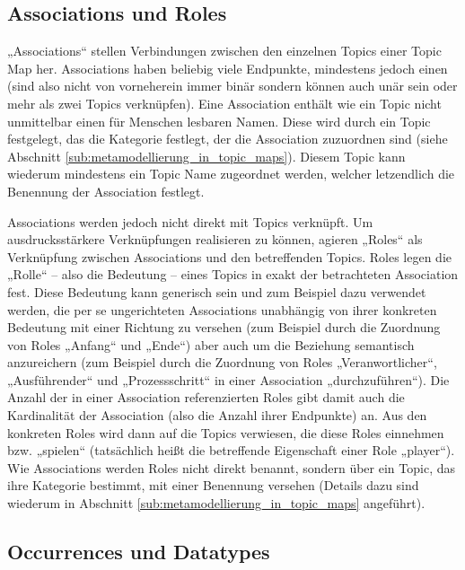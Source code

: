 
\subsection{Associations und Roles} %
\label{sub:associations_und_roles}

„Associations“ stellen Verbindungen zwischen den einzelnen Topics einer Topic Map her. Associations haben beliebig viele Endpunkte, mindestens jedoch einen (sind also nicht von vorneherein immer binär sondern können auch unär sein oder mehr als zwei Topics verknüpfen). Eine Association enthält wie ein Topic nicht unmittelbar einen für Menschen lesbaren Namen. Diese wird durch ein Topic festgelegt, das die Kategorie festlegt, der die Association zuzuordnen sind (siehe Abschnitt \ref{sub:metamodellierung_in_topic_maps}). Diesem Topic kann wiederum mindestens ein Topic Name zugeordnet werden, welcher letzendlich die Benennung der Association festlegt.

Associations werden jedoch nicht direkt mit Topics verknüpft. Um ausdrucksstärkere Verknüpfungen realisieren zu können, agieren „Roles“ als Verknüpfung zwischen Associations und den betreffenden Topics. Roles legen die „Rolle“ -- also die Bedeutung -- eines Topics in exakt der betrachteten Association fest. Diese Bedeutung kann generisch sein und zum Beispiel dazu verwendet werden, die per se ungerichteten Associations unabhängig von ihrer konkreten Bedeutung mit einer Richtung zu versehen (zum Beispiel durch die Zuordnung von Roles „Anfang“ und „Ende“) aber auch um die Beziehung semantisch anzureichern (zum Beispiel durch die Zuordnung von Roles „Veranwortlicher“, „Ausführender“ und „Prozessschritt“ in einer Association „durchzuführen“). Die Anzahl der in einer Association referenzierten Roles gibt damit auch die Kardinalität der Association (also die Anzahl ihrer Endpunkte) an. Aus den konkreten Roles wird dann auf die Topics verwiesen, die diese Roles einnehmen bzw. „spielen“ (tatsächlich heißt die betreffende Eigenschaft einer Role „player“). Wie Associations werden Roles nicht direkt benannt, sondern über ein Topic, das ihre Kategorie bestimmt, mit einer Benennung versehen (Details dazu sind wiederum in Abschnitt \ref{sub:metamodellierung_in_topic_maps} angeführt).


\subsection{Occurrences und Datatypes} %
\label{sub:occurrences_und_datatypes}

